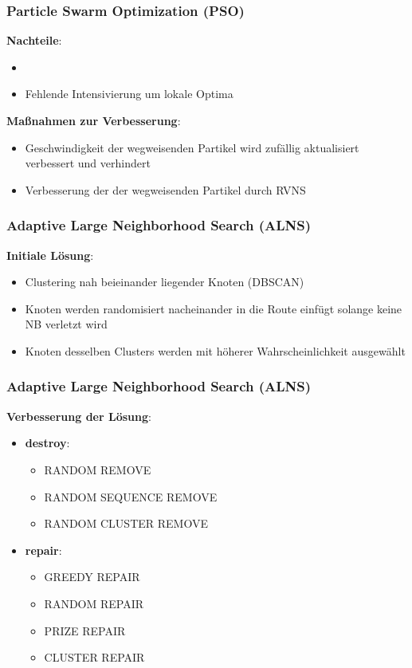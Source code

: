 \documentclass{beamer}
\begin{document}
\begin{frame}
  \frametitle{Particle Swarm Optimization (PSO)}
  \textbf{Nachteile}:
  \begin{itemize}
    \item {}
    \item Fehlende Intensivierung um lokale Optima
  \end{itemize}
  \textbf{Maßnahmen zur Verbesserung}:
  \begin{itemize}
    \item Geschwindigkeit der wegweisenden Partikel wird zufällig aktualisiert \textrightarrow verbessert
     und verhindert 
    \item Verbesserung der  der wegweisenden Partikel durch RVNS
  \end{itemize}
\end{frame}

\begin{frame}
  \frametitle{Adaptive Large Neighborhood Search (ALNS)}
  \textbf{Initiale Lösung}:
  \begin{itemize}
    \item Clustering nah beieinander liegender Knoten (\textsc{DBSCAN})
    \item Knoten werden randomisiert nacheinander in die Route einfügt solange keine NB verletzt wird
    \item Knoten desselben Clusters werden mit höherer Wahrscheinlichkeit ausgewählt
  \end{itemize}
\end{frame}

\begin{frame}
  \frametitle{Adaptive Large Neighborhood Search (ALNS)}
  \textbf{Verbesserung der Lösung}:
  \begin{itemize}
    \item \textbf{destroy}:
    \begin{itemize}
      \item \textsc{RANDOM REMOVE}
      \item \textsc{RANDOM SEQUENCE REMOVE}
      \item \textsc{RANDOM CLUSTER REMOVE}
    \end{itemize}
    \item \textbf{repair}:
    \begin{itemize}
      \item \textsc{GREEDY REPAIR}
      \item \textsc{RANDOM REPAIR}
      \item \textsc{PRIZE REPAIR}
      \item \textsc{CLUSTER REPAIR}
    \end{itemize}
  \end{itemize}
\end{frame}
\end{document}
